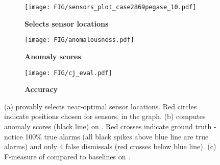 \begin{figure}[htb]
\begin{subfigure}[t]{0.32\textwidth}
    \centering
       \texttt{[image: FIG/sensors\_plot\_case2869pegase\_10.pdf]} 
    \caption{\textbf{Selects sensor locations} \label{fig:sensors_plot_case2869pegase_10} }
\end{subfigure} 
\begin{subfigure}[t]{0.39\textwidth}
    \centering
       \texttt{[image: FIG/anomalousness.pdf]} 
    \caption{\textbf{Anomaly scores} \label{fig:anomalousness} }
\end{subfigure} 
\begin{subfigure}[t]{0.28\textwidth}
    \centering
       \texttt{[image: FIG/cj\_eval.pdf]} 
    \caption{\textbf{Accuracy} \label{fig:cj_eval} }
\end{subfigure} 
\caption{ (a) \method provably selects near-optimal sensor locations. Red circles indicate positions chosen for sensors, in the \datasmall graph.  (b) \methodD computes anomaly scores (black line) on \datasmall. Red crosses indicate ground truth - notice 100\% true alarms (all black spikes above blue line are true alarms) and only 4 false dismissals (red crosses below blue line). (c) F-measure of \method compared to baselines on \datasmall.}
\end{figure}